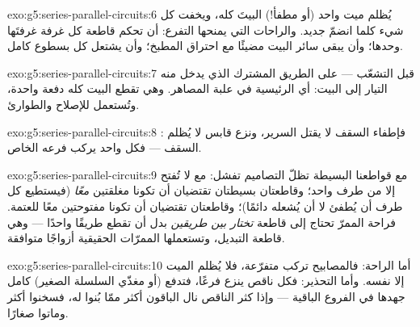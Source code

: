 \begin{solution}{exo:g5:series-parallel-circuits:6}
 يُظلم  ميت واحد (أو  مطفأ!) البيتَ كله،
ويخفت كل شيء كلما انضمّ  جديد. والراحات التي يمنحها التفرع:
أن تحكم قاطعة كل غرفة غرفتَها وحدها؛ وأن يبقى سائر البيت مضيئًا
مع احتراق  المطبخ؛ وأن يشتعل كل  بسطوع كامل.
\end{solution}

\begin{solution}{exo:g5:series-parallel-circuits:7}
قبل التشعّب --- على الطريق المشترك الذي يدخل منه التيار إلى
البيت: أي  الرئيسية في علبة المصاهر. وهي تقطع البيت كله
دفعة واحدة، وتُستعمل للإصلاح والطوارئ.
\end{solution}

\begin{solution}{exo:g5:series-parallel-circuits:8}
: فإطفاء  السقف لا يقتل  السرير، ونزع قابس
 لا يُظلم السقف --- فكل واحد يركب فرعه الخاص.
\end{solution}

\begin{solution}{exo:g5:series-parallel-circuits:9}
مع قواطعنا البسيطة تظلّ التصاميم تفشل:   مع
 لا تُفتح إلا من طرف واحد؛ وقاطعتان بسيطتان 
تقتضيان أن تكونا مغلقتين \emph{معًا} (فيستطيع كل طرف أن يُطفئ
 لا أن يُشعله دائمًا)؛ وقاطعتان  تقتضيان أن
تكونا مفتوحتين معًا للعتمة. فراحة الممرّ تحتاج إلى قاطعة
\emph{تختار بين طريقين} بدل أن تقطع طريقًا واحدًا --- وهي قاطعة
التبديل، وتستعملها الممرّات الحقيقية أزواجًا متوافقة.
\end{solution}

\begin{solution}{exo:g5:series-parallel-circuits:10}
أما الراحة: فالمصابيح تركب  متفرّعة، فلا يُظلم 
الميت إلا نفسه. وأما التحذير: فكل  ناقص ينزع فرعًا، فتدفع
 (أو مغذّي السلسلة الصغير) كامل جهدها في الفروع الباقية
--- وإذا كثر الناقص نال الباقون أكثر ممّا بُنوا له، فسخنوا أكثر
وماتوا صغارًا.
\end{solution}

